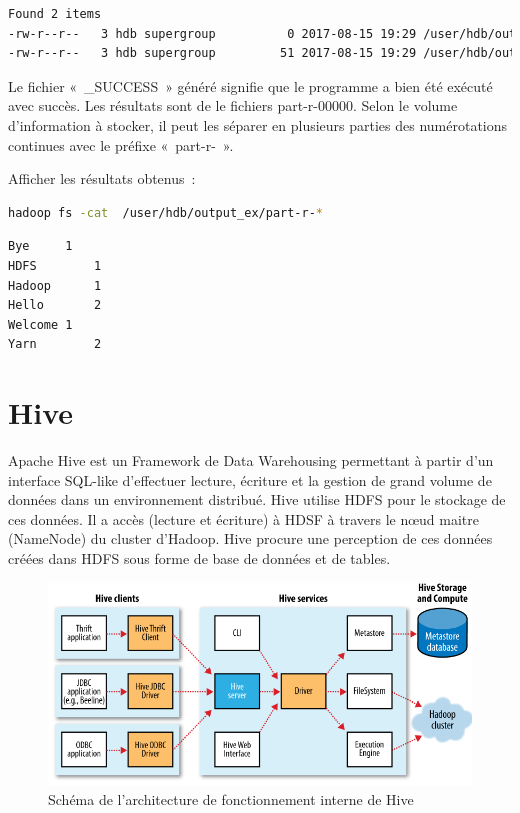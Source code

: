 \documentclass[12pt,french]{book}
\begin{document}
\begin{lstlisting}[language=bash, frame=single]
Found 2 items
-rw-r--r--   3 hdb supergroup          0 2017-08-15 19:29 /user/hdb/output_ex/_SUCCESS
-rw-r--r--   3 hdb supergroup         51 2017-08-15 19:29 /user/hdb/output_ex/part-r-00000
\end{lstlisting}

Le fichier « \_SUCCESS » généré signifie que le programme a bien été exécuté avec succès. Les résultats sont de le fichiers part-r-00000.  Selon le volume d’information à stocker, il peut les séparer en plusieurs parties des numérotations continues avec le préfixe « part-r- ».

Afficher les résultats obtenus :

\begin{lstlisting}[language=bash, frame=single]
hadoop fs -cat  /user/hdb/output_ex/part-r-*
\end{lstlisting}

\begin{lstlisting}[language=bash, frame=single]
Bye		1
HDFS		1
Hadoop		1
Hello		2
Welcome	1
Yarn		2 
\end{lstlisting}

\section{Hive}

Apache Hive est un Framework de Data Warehousing permettant à partir d’un interface SQL-like d’effectuer lecture, écriture et la gestion de grand volume de données dans un environnement distribué. 
Hive utilise HDFS pour le stockage de ces données.
Il a accès (lecture et écriture) à HDSF à travers le nœud maitre (NameNode) du cluster d’Hadoop.
Hive procure une perception de ces données créées dans HDFS sous forme de base de données et de tables.

\begin{figure}[ht]
	\centering
	\includegraphics[width=\linewidth]{hiveSchema}
	\caption[Schéma de l'architecture de fonctionnement interne de Hive]{Schéma de l'architecture de fonctionnement interne de Hive \footnotemark}
\end{figure}
\end{document}
